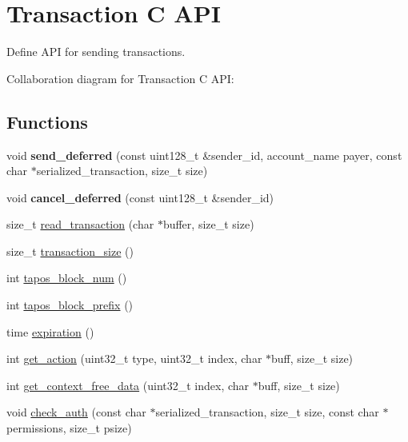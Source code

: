 \hypertarget{group__transactioncapi}{}\section{Transaction C A\+PI}
\label{group__transactioncapi}


Define A\+PI for sending transactions.  


Collaboration diagram for Transaction C A\+PI\+:
\subsection*{Functions}
\begin{DoxyCompactItemize}
\item 
\mbox{\label{group__transactioncapi_gaa7c68af746c8bd721d7c0817d6904a76}} 
void {\bfseries send\+\_\+deferred} (const uint128\+\_\+t \&sender\+\_\+id, account\+\_\+name payer, const char $\ast$serialized\+\_\+transaction, size\+\_\+t size)
\item 
\mbox{\label{group__transactioncapi_ga040f3e33d271531da96e0f5244d1a365}} 
void {\bfseries cancel\+\_\+deferred} (const uint128\+\_\+t \&sender\+\_\+id)
\item 
size\+\_\+t \mbox{\hyperlink{group__transactioncapi_ga73fa4253ae0aec55399c26b740223bc6}{read\+\_\+transaction}} (char $\ast$buffer, size\+\_\+t size)
\item 
size\+\_\+t \mbox{\hyperlink{group__transactioncapi_gadfcd2e00f00461eac891ee8433508609}{transaction\+\_\+size}} ()
\item 
int \mbox{\hyperlink{group__transactioncapi_gac0b858a766ca73c6415bdb799d6ef45a}{tapos\+\_\+block\+\_\+num}} ()
\item 
int \mbox{\hyperlink{group__transactioncapi_gaef5458ccfe8ca5d6b273e35d04c56371}{tapos\+\_\+block\+\_\+prefix}} ()
\item 
time \mbox{\hyperlink{group__transactioncapi_ga284f37e545cbb7f847f3ab86f50feb1d}{expiration}} ()
\item 
int \mbox{\hyperlink{group__transactioncapi_gaf1fe78f3caf24010302e5cac1edad61d}{get\+\_\+action}} (uint32\+\_\+t type, uint32\+\_\+t index, char $\ast$buff, size\+\_\+t size)
\item 
int \mbox{\hyperlink{group__transactioncapi_gad0f4f1bd76077b3ee4289aadfb84c2b2}{get\+\_\+context\+\_\+free\+\_\+data}} (uint32\+\_\+t index, char $\ast$buff, size\+\_\+t size)
\item 
void \mbox{\hyperlink{group__transactioncapi_ga4eb270c6316a15e6f579b4b448bc8a74}{check\+\_\+auth}} (const char $\ast$serialized\+\_\+transaction, size\+\_\+t size, const char $\ast$permissions, size\+\_\+t psize)
\end{DoxyCompactItemize}


